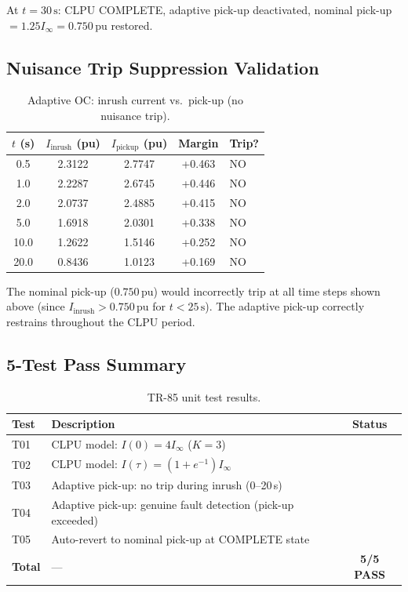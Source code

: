 \documentclass[11pt, a4paper]{article}
\newcommand{\pu}{\,\text{pu}}
\newcommand{\cmark}{\ding{51}}
\begin{document}
At $t = 30\,\text{s}$: CLPU COMPLETE, adaptive pick-up deactivated,
nominal pick-up $= 1.25 I_\infty = 0.750\pu$ restored.

\subsection{Nuisance Trip Suppression Validation}

\begin{table}[ht]
\centering
\caption{Adaptive OC: inrush current vs.\ pick-up (no nuisance trip).}
\label{tab:suppress}
\begin{tabular}{ccccl}
\toprule
$t$ (s) & $I_{\mathrm{inrush}}$ (pu) & $I_{\mathrm{pickup}}$ (pu) & Margin & Trip? \\
\midrule
0.5  & 2.3122 & 2.7747 & +0.463 & NO \\
1.0  & 2.2287 & 2.6745 & +0.446 & NO \\
2.0  & 2.0737 & 2.4885 & +0.415 & NO \\
5.0  & 1.6918 & 2.0301 & +0.338 & NO \\
10.0 & 1.2622 & 1.5146 & +0.252 & NO \\
20.0 & 0.8436 & 1.0123 & +0.169 & NO \\
\bottomrule
\end{tabular}
\end{table}

The nominal pick-up ($0.750\pu$) would incorrectly trip at all time steps
shown above (since $I_{\mathrm{inrush}} > 0.750\pu$ for $t < 25\,\text{s}$).
The adaptive pick-up correctly restrains throughout the CLPU period.

\subsection{5-Test Pass Summary}

\begin{table}[ht]
\centering
\caption{TR-85 unit test results.}
\label{tab:tests}
\begin{tabular}{llc}
\toprule
Test & Description & Status \\
\midrule
T01 & CLPU model: $I(0) = 4 I_\infty$ ($K=3$) & \cmark \\
T02 & CLPU model: $I(\tau) = (1 + e^{-1}) I_\infty$ & \cmark \\
T03 & Adaptive pick-up: no trip during inrush (0--20\,s) & \cmark \\
T04 & Adaptive pick-up: genuine fault detection (pick-up exceeded) & \cmark \\
T05 & Auto-revert to nominal pick-up at COMPLETE state & \cmark \\
\midrule
\textbf{Total} & --- & \textbf{5/5 PASS} \\
\bottomrule
\end{tabular}
\end{table}
\end{document}
